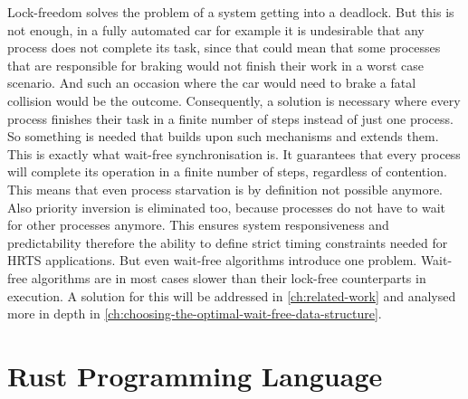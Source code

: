 Lock-freedom solves the problem of a system getting into a deadlock. But this is not enough, in a fully automated car for example it is undesirable that any process does not complete its task, since that could mean that some processes that are responsible for braking would not finish their work in a worst case scenario. And such an occasion where the car would need to brake a fatal collision would be the outcome. Consequently, a solution is necessary where every process finishes their task in a finite number of steps instead of just one process. So something is needed that builds upon such mechanisms and extends them. This is exactly what wait-free synchronisation is. It guarantees that every process will complete its operation in a finite number of steps, regardless of contention. This means that even process starvation is by definition not possible anymore. Also priority inversion is eliminated too, because processes do not have to wait for other processes anymore. This ensures system responsiveness and predictability therefore the ability to define strict timing constraints needed for \ac{HRTS} applications. But even wait-free algorithms introduce one problem. Wait-free algorithms are in most cases slower than their lock-free counterparts in execution. A solution for this will be addressed in \cref{ch:related-work} and analysed more in depth in \cref{ch:choosing-the-optimal-wait-free-data-structure}.

\section{Rust Programming Language}\label{sec:rust}

